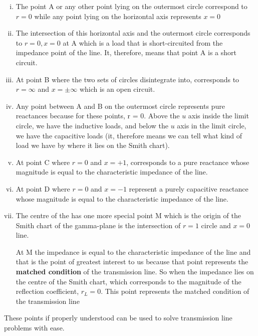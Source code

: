 \begin{enumerate}[(i)]
\item The point A or any other point lying on the outermost circle correspond to $r = 0$ while any point lying on the horizontal axis represents $x = 0$

\item The intersection of this horizontal axis and the outermost circle corresponds to $r = 0,x = 0$ at A which is a load that is short-circuited from the impedance point of the line. It, therefore, means that point A is a short circuit.

\item At point B where the two sets of circles disintegrate into, corresponds to $r = \infty$ and $x = \pm\infty $ which is an open circuit.

\item Any point between A and B on the outermost circle represents pure reactances because for these points, r = 0. Above the $u$ axis inside the limit circle, we have the inductive loads, and below the $u$ axis in the limit circle, we have the capacitive loads (it, therefore means we can tell what kind of load we have by where it lies on the Smith chart).

\item At point C where $r = 0$ and $x = +1$, corresponds to a pure reactance whose magnitude is equal to the characteristic impedance of the line.

\item At point D where $r = 0$ and $x = -1$ represent a purely capacitive reactance whose magnitude is equal to the characteristic impedance of the line.

\item The centre of the  has one more special point M which is the origin of the Smith chart of the gamma-plane is the intersection of $r = 1$ circle and $x = 0$ line.

At M the impedance is equal to the characteristic impedance of the line and that is the point of greatest interest to us because that point represents the \textbf{matched condition} of the transmission line. So when the impedance lies on the centre of the Smith chart, which corresponds to the magnitude of the reflection coefficient, $r_L = 0$. This point represents the matched condition of the transmission line
\end{enumerate}
These points if properly understood can be used to solve transmission line problems with ease.


